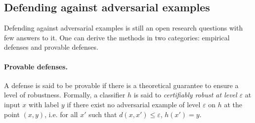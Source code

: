 





\subsection{Defending against adversarial examples}

Defending against adversarial examples is still an open research questions with few answers to it. One can derive the methods in two categories: empirical defenses and provable defenses.

\paragraph{Provable defenses.} A defense is said to be provable if there is a theoretical guarantee to ensure a level of robustness. Formally, a classifier $h$ is said to \emph{certifiably robust at level $\varepsilon$} at input $x$ with label $y$ if there exist no adversarial example of level $\varepsilon$ on $h$ at the point $(x,y)$, i.e. for all $x'$ such that $d(x,x')\leq\varepsilon$, $h(x') = y$. 

